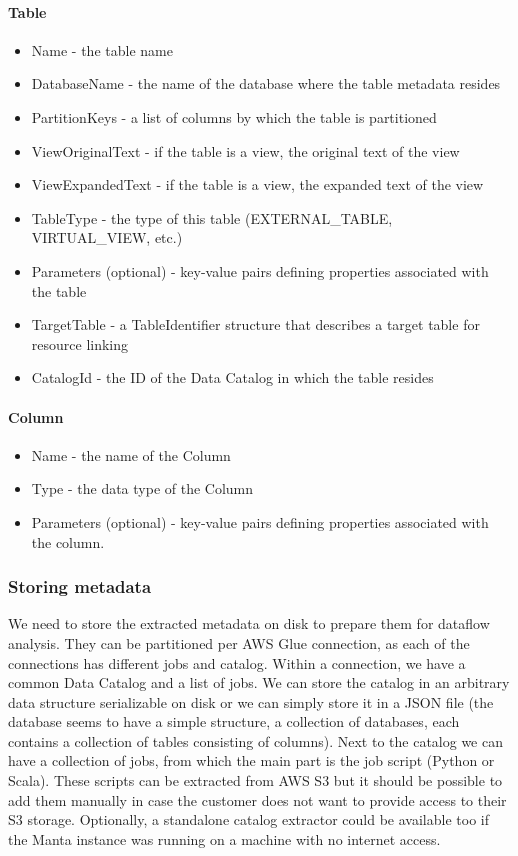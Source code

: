 \paragraph{Table}
\begin{itemize}
    \item Name - the table name
    \item DatabaseName  - the name of the database where the table metadata resides
    \item PartitionKeys - a list of columns by which the table is partitioned
    \item ViewOriginalText - if the table is a view, the original text of the view
    \item ViewExpandedText - if the table is a view, the expanded text of the view
    \item TableType - the type of this table (EXTERNAL\_TABLE, VIRTUAL\_VIEW, etc.)
    \item Parameters (optional) - key-value pairs defining properties associated with the table
    \item TargetTable - a TableIdentifier structure that describes a target table for resource linking
    \item CatalogId - the ID of the Data Catalog in which the table resides
\end{itemize}

\paragraph{Column}
\begin{itemize}
    \item Name - the name of the Column
    \item Type - the data type of the Column
    \item Parameters (optional) - key-value pairs defining properties associated with the column.
\end{itemize}

\subsubsection{Storing metadata}
We need to store the extracted metadata on disk to prepare them for dataflow analysis. They can be partitioned per AWS Glue connection, as each of the connections has different jobs and catalog. Within a connection, we have a common Data Catalog and a list of jobs. We can store the catalog in an arbitrary data structure serializable on disk or we can simply store it in a JSON file (the database seems to have a simple structure, a collection of databases, each contains a collection of tables consisting of columns). Next to the catalog we can have a collection of jobs, from which the main part is the job script (Python or Scala). These scripts can be extracted from AWS S3 but it should be possible to add them manually in case the customer does not want to provide access to their S3 storage. Optionally, a standalone catalog extractor could be available too if the Manta instance was running on a machine with no internet access.

